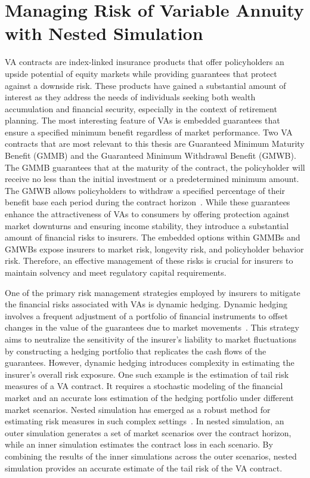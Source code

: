 \section{Managing Risk of Variable Annuity with Nested Simulation}

VA contracts are index-linked insurance products that offer policyholders an upside potential of equity markets while providing guarantees that protect against a downside risk.
These products have gained a substantial amount of interest as they address the needs of individuals seeking both wealth accumulation and financial security, especially in the context of retirement planning.
The most interesting feature of VAs is embedded guarantees that ensure a specified minimum benefit regardless of market performance.
Two VA contracts that are most relevant to this thesis are Guaranteed Minimum Maturity Benefit (GMMB) and the Guaranteed Minimum Withdrawal Benefit (GMWB). 
The GMMB guarantees that at the maturity of the contract, the policyholder will receive no less than the initial investment or a predetermined minimum amount. 
The GMWB allows policyholders to withdraw a specified percentage of their benefit base each period during the contract horizon~\citep{hardy2003investment}.
While these guarantees enhance the attractiveness of VAs to consumers by offering protection against market downturns and ensuring income stability, they introduce a substantial amount of financial risks to insurers. 
The embedded options within GMMBs and GMWBs expose insurers to market risk, longevity risk, and policyholder behavior risk. 
Therefore, an effective management of these risks is crucial for insurers to maintain solvency and meet regulatory capital requirements.

One of the primary risk management strategies employed by insurers to mitigate the financial risks associated with VAs is dynamic hedging. 
Dynamic hedging involves a frequent adjustment of a portfolio of financial instruments to offset changes in the value of the guarantees due to market movements~\citep{hull2016options}. 
This strategy aims to neutralize the sensitivity of the insurer's liability to market fluctuations by constructing a hedging portfolio that replicates the cash flows of the guarantees.
However, dynamic hedging introduces complexity in estimating the insurer's overall risk exposure.
One such example is the estimation of tail risk measures of a VA contract.
It requires a stochastic modeling of the financial market and an accurate loss estimation of the hedging portfolio under different market scenarios.
Nested simulation has emerged as a robust method for estimating risk measures in such complex settings~\citep{gordy2010nested}.
In nested simulation, an outer simulation generates a set of market scenarios over the contract horizon, while an inner simulation estimates the contract loss in each scenario.
By combining the results of the inner simulations across the outer scenarios, nested simulation provides an accurate estimate of the tail risk of the VA contract.

